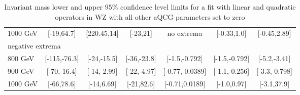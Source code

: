 \documentclass[../Bachelorarbeit.tex]{subfiles}
\begin{document}
\begin{table}[h]
\begin{tabular}{ l c c c c c c }
        1000 GeV & [-19,64.7]   & [220.45,14]   & [-23,21]     & no extrema      & [-0.33,1.0]   & [-0.45,2.89]  \\
        \multicolumn{7}{l}{ negative extrema }                                                                   \\
        800 GeV  & [-115,-76.3] & [-24,-15.5]   & [-36,-23.8]  & [-1.5,-0.792]   & [-1.5,-0.792] & [-5.2,-3.41]  \\
        900 GeV  & [-70,-16.4]  & [-14,-2.99]   & [-22,-4.97]  & [-0.77,-0.0389] & [-1.1,-0.256] & [-3.3,-0.798] \\
        1000 GeV & [-66,78.6]   & [-14,6.69]    & [-21,82.6]   & [-0.71,0.0189]  & [-1.0,0.97]   & [-3.1,37.9]   \\
        \hline
    \end{tabular}

    \caption{Invariant mass lower and upper $95\%$ confidence level limits for a fit with linear and quadratic operators in WZ with all other aQCG parameters set to zero}
    \label{tab:inv_mass_EFT_limits}

\end{table}
\end{document}
